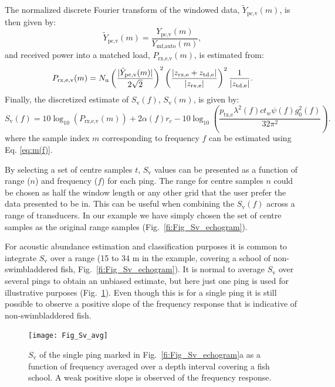 \documentclass[preprint,12pt,TurnOnLineNumbers]{JASAnew}
\newcommand{\timesym}{t}
\newcommand{\freqsym}{f}
\newcommand{\samplesymt}{n}
\newcommand{\samplesymf}{m}
\newcommand{\nchannels}{N_{\textrm{u}}}
\newcommand{\zrxe}{z_{\textrm{rx,e}}}
\newcommand{\ztde}{z_{\textrm{td,e}}}
\newcommand{\ptxe}{p_{\textrm{tx,e}}}
\newcommand{\ypcvolumef}{Y_{\textrm{pc,v}}}
\newcommand{\ypcvolumenormf}{\tilde{Y}_{\textrm{pc,v}}}
\newcommand{\ymfautof}{Y_{\textrm{mf,auto}}}
\newcommand{\prxevf}{P_{\textrm{rx,e,v}}}
\newcommand{\tslide}{t_w}
\newcommand{\sv}{S_{\textrm{v}}}
\newcommand{\range}{r}
\newcommand{\gainzero}{g_0}
\newcommand{\eqang}{\psi}
\newcommand{\wlen}{\lambda}
\newcommand{\cw}{c}
\newcommand{\absorp}{\alpha}
\begin{document}
The normalized discrete Fourier transform of the windowed data, $\ypcvolumenormf(\samplesymf)$, is then given by:
%
\begin{equation}
\label{eq:FFT_volume_norm}
\ypcvolumenormf(\samplesymf) = \frac{\ypcvolumef(\samplesymf)}{\ymfautof(\samplesymf)},
\end{equation}
%
and received power into a matched load, $\prxevf(\samplesymf)$, is estimated from:
%
\begin{equation}
\label{eq:prx_FFT_volume}
\prxevf(\samplesymf) = \nchannels \left( \frac{|\ypcvolumenormf(\samplesymf)|}{2\sqrt{2}} \right)^2 \left( \frac{|\zrxe+\ztde|}{|\zrxe|}\right)^2 \\
\frac{1}{|\ztde|}. %
\end{equation}
%
Finally, the discretized estimate of $\sv(\freqsym)$, $\sv(\samplesymf)$, is given by:
%
\begin{equation}
\label{eq:Sv_FFT}
\sv(\freqsym) = 10\log_{10}(\prxevf(\samplesymf)) + 2\absorp(\freqsym) \range_c - 10\log_{10}\left( \frac{\ptxe \wlen^2(\freqsym) \cw \tslide \eqang(\freqsym) \gainzero^2(\freqsym) }{32\pi^2} \right).
\end{equation}
where the sample index $\samplesymf$ corresponding to frequency $\freqsym$ can be estimated using Eq. {\ref{eq:m(f)}}.

By selecting a set of centre samples $\timesym$, $\sv$ values can be presented as a function of range ($\samplesymt$) and frequency ($\freqsym$) for each ping. The range for centre samples $\samplesymt$ could be chosen as half the window length or any other grid that the user prefer the data presented to be in. This can be useful when combining the $\sv(\freqsym)$ across a range of transducers. In our example we have simply chosen the set of centre samples as the original range samples (Fig.~\ref{fi:Fig_Sv_echogram}).

For acoustic abundance estimation and classification purposes it is common to integrate $\sv$ over a range (15 to 34 m in the example, covering a school of non-swimbladdered fish, Fig.~\ref{fi:Fig_Sv_echogram}). It is normal to average $\sv$ over several pings to obtain an unbiased estimate, but here just one ping is used for illustrative purposes (Fig.~\ref{Fig_Sv_avg}). Even though this is for a single ping it is still possible to observe a positive slope of the frequency response that is indicative of non-swimbladdered fish. 

\begin{figure}
\texttt{[image: Fig\_Sv\_avg]}
\caption{\label{Fig_Sv_avg} $\sv$ of the single ping marked in Fig.~\ref{fi:Fig_Sv_echogram}a as a function of frequency averaged over a depth interval covering a fish school. A weak positive slope is observed of the frequency response.}
\end{figure}
\end{document}
